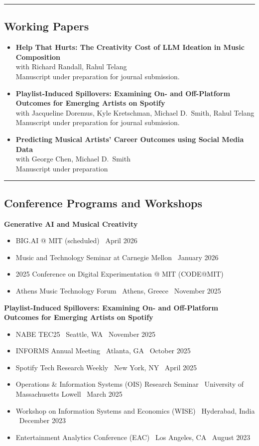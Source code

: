 \documentclass[10pt,letterpaper]{article}
\newcommand{\sep}{{\color{gray}\,\textbullet\,\,}}
\newcommand{\hsep}{\noindent\textcolor{gray}{\rule{\textwidth}{0.5pt}}}
\newcommand{\block}[1]{\begin{samepage}\hsep\subsection*{#1}\end{samepage}}
\begin{document}
\block{Working Papers}

\begin{itemize}
\item \textbf{Help That Hurts: The Creativity Cost of LLM Ideation in Music Composition} \\
with Richard Randall, Rahul Telang \\
Manuscript under preparation for journal submission.
\item \textbf{Playlist-Induced Spillovers: Examining On- and Off-Platform Outcomes for Emerging Artists on Spotify} \\
with Jacqueline Doremus, Kyle Kretschman, Michael D.\ Smith, Rahul Telang \\
Manuscript under preparation for journal submission.
\item \textbf{Predicting Musical Artists' Career Outcomes using Social Media Data} \\
with George Chen, Michael D.\ Smith \\
Manuscript under preparation
\end{itemize}

\block{Conference Programs and Workshops}

\textbf{Generative AI and Musical Creativity}
\begin{itemize}
\item BIG.AI @ MIT (scheduled) \sep April 2026
\item Music and Technology Seminar at Carnegie Mellon \sep January 2026
\item 2025 Conference on Digital Experimentation @ MIT (CODE@MIT)
\item Athens Music Technology Forum \sep Athens, Greece \sep November 2025
\end{itemize}

\textbf{Playlist-Induced Spillovers: Examining On- and Off-Platform Outcomes for Emerging Artists on Spotify}
\begin{itemize}
\item NABE TEC25 \sep Seattle, WA \sep November 2025
\item INFORMS Annual Meeting \sep Atlanta, GA \sep October 2025
\item Spotify Tech Research Weekly \sep New York, NY \sep April 2025
\item Operations \& Information Systems (OIS) Research Seminar \sep University of Massachusetts Lowell \sep March 2025
\item Workshop on Information Systems and Economics (WISE) \sep Hyderabad, India \sep December 2023
\item Entertainment Analytics Conference (EAC) \sep Los Angeles, CA \sep August 2023
\end{itemize}
\end{document}
